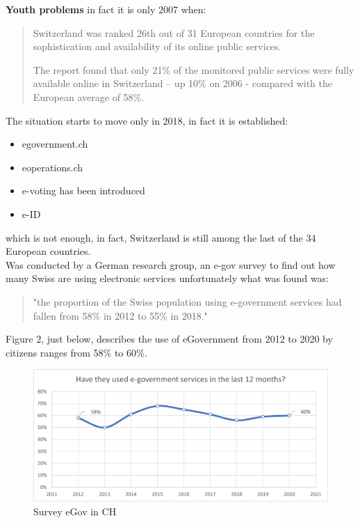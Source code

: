 \textbf{Youth problems} in fact it is only 2007 when:
\begin{quote}Switzerland was ranked 26th out of 31 European countries for the sophistication and availability of its online public services.

The report found that only 21\% of the monitored public services were fully available online in Switzerland – up 10\% on 2006 - compared with the European average of 58\%.~\cite{swisslags2007}\end{quote}

The situation starts to move only in 2018, in fact it is established:
\begin{itemize}
\item egovernment.ch
\item eoperations.ch
\item e-voting has been introduced
\item e-ID
\end{itemize}

which is not enough, in fact, Switzerland is still among the last of the 34 European countries.\\

Was conducted by a German research group, an e-gov survey to find out how many Swiss are using electronic services unfortunately what was found was:
\begin{quotation}
"the proportion of the Swiss population using e-government services had fallen from 58\% in 2012 to 55\% in 2018."\cite{swisslags}
\end{quotation}

\newpage
Figure 2, just below, describes the use of eGovernment from 2012 to 2020 by citizens ranges from 58\% to 60\%.

\begin{figure}[!htb]
\centering
\includegraphics[width=1\textwidth]{images/tenYears.jpg}
\caption{Survey eGov in CH \cite{10years}}
\label{10years}
\end{figure}
\FloatBarrier

